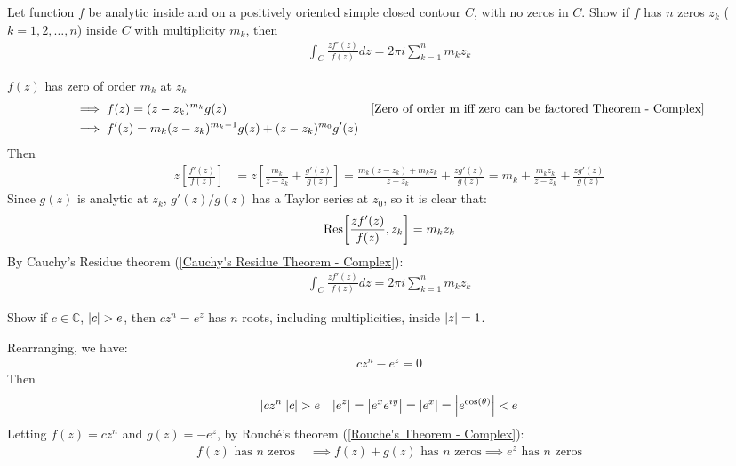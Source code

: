 \documentclass[12pt, english]{book}
\makeatletter
\renewenvironment{proof}[1][\proofname]{\par
	\pushQED{\qed}%
	\normalfont \topsep6\p@\@plus6\p@\relax
	\list{}{%
		\settowidth{\leftmargin}{\itshape\proofname:\hskip\labelsep}%
		\setlength{\labelwidth}{0pt}%
		\setlength{\itemindent}{-\leftmargin}%
		}%
	\item[\hskip\labelsep\itshape#1\@addpunct{:}]\ignorespaces
	}{\popQED\endlist\@endpefalse}
\makeatother
\begin{document}
	\begin{example}
		Let function \(f\) be analytic inside and on a positively oriented simple closed contour \(C\), with no zeros in \(C\). Show if \(f\) has \(n\) zeros \(z_k\) (\(k = 1, 2, \ldots, n\)) inside \(C\) with multiplicity \(m_k\), then
		\begin{align*}
			\int_{C} \frac{zf'(z)}{f(z)} dz = 2 \pi i \sum_{k=1}^{n} m_k z_k
		\end{align*}
		\begin{proof}
			{\color{Grey}
			\(f(z)\) has zero of order \(m_k\) at \(z_k\)
			\begin{align*}
				&\implies f(z) = (z-z_k)^{m_k} g(z) 
					& \text{\Cref{Zero of order m iff zero can be factored Theorem - Complex}} \\
				&\implies f'(z) = m_k (z-z_k)^{m_k - 1} g(z) + (z-z_k)^{m_0} g'(z) \\
			\end{align*}
			Then 
			\begin{align*}
				z \left[\frac{f'(z)}{f(z)}\right]
				&= z \left[ \frac{m_k}{z-z_k} + \frac{g'(z)}{g(z)}\right]
				= \frac{m_k (z-z_k) + m_k z_k}{z-z_k} + \frac{z g'(z)}{g(z)} 
				= m_k + \frac{m_k z_k}{z-z_k} + \frac{z g'(z)}{g(z)}
			\end{align*}
			Since \(g(z)\) is analytic at \(z_k\), \(g'(z)/g(z)\) has a Taylor series at \(z_0\), so it is clear that:
			\begin{align*}
				\Res[\frac{zf'(z)}{f(z)}, z_k] = m_k z_k
			\end{align*}
			By Cauchy's Residue theorem (\cref{Cauchy's Residue Theorem - Complex}):
			\begin{align*}
				\int_{C} \frac{zf'(z)}{f(z)} dz = 2 \pi i \sum_{k=1}^{n} m_k z_k
			\end{align*}
			}
		\end{proof}
	\end{example}

	\begin{example}
		Show if \(c \in \mathbb{C}\), \(\abs{c}>e\), then \(cz^n = e^z\) has \(n\) roots, including multiplicities, inside \(\abs{z} = 1\).
		\begin{proof}
			{\color{Grey}
			Rearranging, we have:
			\begin{align*}
				cz^n - e^z = 0
			\end{align*}
			Then 
			\begin{align*}
				\abs{cz^n} & \abs{c} > e & \abs{e^z} = \abs{e^x e^{iy}} = \abs{e^x} = \abs{e^{\cos(\theta)}} < e
			\end{align*}
			Letting \(f(z) = cz^n\) and \(g(z) = -e^{z}\), by Rouché's theorem (\cref{Rouche's Theorem - Complex}):
		 	\begin{align*}
		 		f(z) \text{ has } n \text{ zeros } 
		 		&\implies f(z) + g(z) \text{ has } n \text{ zeros} 
		 		 \implies e^{z} \text{ has } n \text{ zeros}
		 	\end{align*}
			}
		\end{proof}
	\end{example}
\end{document}
